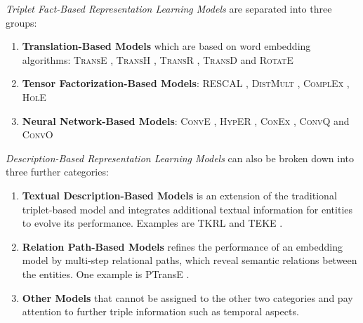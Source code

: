 \textit{Triplet Fact-Based Representation Learning Models} are separated into three groups:
\begin{enumerate}
    \item 
    \textbf{Translation-Based Models}  which are based on word embedding algorithms: 
    \textsc{TransE} \cite{TransE}, \textsc{TransH} \cite{TransH}, \textsc{TransR} \cite{TransR}, \textsc{TransD} \cite{TransD}
    and 
    \textsc{RotatE} \cite{RotatE}
    
    \item 
    \textbf{Tensor Factorization-Based Models}:
    \textsc{RESCAL} \cite{RESCAL}, \textsc{DistMult} \cite{DistMult}, \textsc{ComplEx} \cite{ComplEx}, \textsc{HolE} \cite{HolE}
    
    \item 
    \textbf{Neural Network-Based Models}: 
    \textsc{ConvE} \cite{ConvE}, \textsc{HypER} \cite{HypER}, \textsc{ConEx} \cite{ConEx}, \textsc{ConvQ} and  \textsc{ConvO} \cite{demir2021convolutional}
\end{enumerate}
\textit{Description-Based Representation Learning Models} can also be broken down into three further categories:
\begin{enumerate}
    \item 
    \textbf{Textual Description-Based Models} is an extension of the traditional triplet-based model and integrates additional textual information for entities to evolve its performance.
    Examples are \ac{TKRL} \cite{TKRL} and \ac{TEKE} \cite{TEKE}.
    
    \item 
    \textbf{Relation Path-Based Models} refines the performance of an embedding model by multi-step relational paths, which reveal semantic relations between the entities.
    One example is \ac{PTransE} \cite{PTransE}.
    
     \item 
    \textbf{Other Models} that cannot be assigned to the other two categories and pay attention to further triple information such as temporal aspects.
\end{enumerate}


